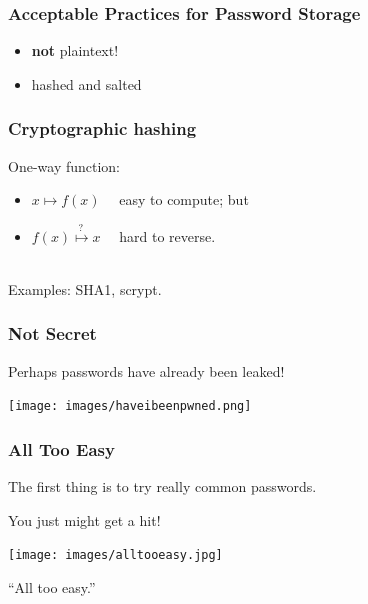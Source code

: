 \begin{frame}
  \frametitle{Acceptable Practices for Password Storage}
  
    \begin{itemize}
    \item {\Huge \alert{{\bf not} plaintext!}}
    \item \Large hashed and salted
    \end{itemize}
       

\end{frame}

\begin{frame}
  \frametitle{Cryptographic hashing}
  
    One-way function:
    \begin{itemize}
    \item $x \mapsto f(x)$ ~~easy to compute; but
      \item $f(x) \stackrel{?~}{\mapsto} x$ ~~hard to reverse.
    \end{itemize}~\\
    Examples: SHA1, scrypt.

\end{frame}


\begin{frame}
\frametitle{Not Secret}
Perhaps passwords have already been leaked!

\begin{center}
	\texttt{[image: images/haveibeenpwned.png]}
\end{center}


\end{frame}


\begin{frame}
\frametitle{All Too Easy}

The first thing is to try really common passwords.

You just might get a hit!

\begin{center}
	\texttt{[image: images/alltooeasy.jpg]}
\end{center}

``All too easy.''

\end{frame}


